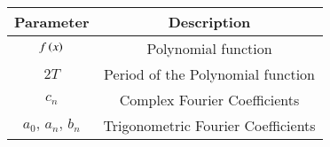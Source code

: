 \begin{tabular}[12pt]{ |c| c|}
    \hline
    \textbf{Parameter} & \textbf{Description}\\ 
    \hline
    $f\left(x\right)$ & Polynomial function\\
    \hline
    $2T$& Period of the Polynomial function\\ 
    \hline
    $c_n$ & Complex Fourier Coefficients\\
    \hline
    $a_0,\,a_n,\,b_n$& Trigonometric Fourier Coefficients\\
    \hline   
    \end{tabular}
